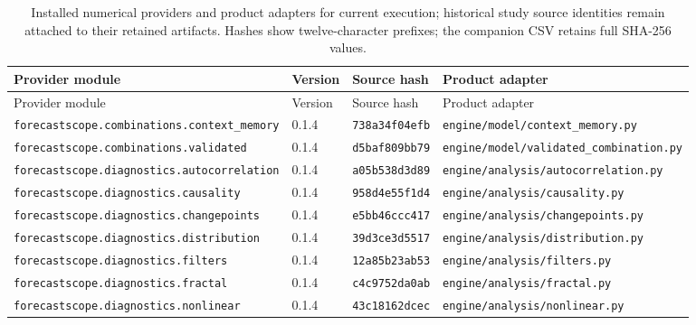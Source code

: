 \begin{longtable}{p{}p{}p{}p{}}
\caption{Installed numerical providers and product adapters for current execution; historical study source identities remain attached to their retained artifacts. Hashes show twelve-character prefixes; the companion CSV retains full SHA-256 values.}\label{tab:numerical-providers}\\
\toprule Provider module & Version & Source hash & Product adapter\\\midrule\endfirsthead
\toprule Provider module & Version & Source hash & Product adapter\\\midrule\endhead
\texttt{forecastscope.\allowbreak{}combinations.\allowbreak{}context\_memory} & 0.1.4 & \texttt{738a34f04efb} & \texttt{engine/\allowbreak{}model/\allowbreak{}context\_memory.\allowbreak{}py}\\
\texttt{forecastscope.\allowbreak{}combinations.\allowbreak{}validated} & 0.1.4 & \texttt{d5baf809bb79} & \texttt{engine/\allowbreak{}model/\allowbreak{}validated\_combination.\allowbreak{}py}\\
\texttt{forecastscope.\allowbreak{}diagnostics.\allowbreak{}autocorrelation} & 0.1.4 & \texttt{a05b538d3d89} & \texttt{engine/\allowbreak{}analysis/\allowbreak{}autocorrelation.\allowbreak{}py}\\
\texttt{forecastscope.\allowbreak{}diagnostics.\allowbreak{}causality} & 0.1.4 & \texttt{958d4e55f1d4} & \texttt{engine/\allowbreak{}analysis/\allowbreak{}causality.\allowbreak{}py}\\
\texttt{forecastscope.\allowbreak{}diagnostics.\allowbreak{}changepoints} & 0.1.4 & \texttt{e5bb46ccc417} & \texttt{engine/\allowbreak{}analysis/\allowbreak{}changepoints.\allowbreak{}py}\\
\texttt{forecastscope.\allowbreak{}diagnostics.\allowbreak{}distribution} & 0.1.4 & \texttt{39d3ce3d5517} & \texttt{engine/\allowbreak{}analysis/\allowbreak{}distribution.\allowbreak{}py}\\
\texttt{forecastscope.\allowbreak{}diagnostics.\allowbreak{}filters} & 0.1.4 & \texttt{12a85b23ab53} & \texttt{engine/\allowbreak{}analysis/\allowbreak{}filters.\allowbreak{}py}\\
\texttt{forecastscope.\allowbreak{}diagnostics.\allowbreak{}fractal} & 0.1.4 & \texttt{c4c9752da0ab} & \texttt{engine/\allowbreak{}analysis/\allowbreak{}fractal.\allowbreak{}py}\\
\texttt{forecastscope.\allowbreak{}diagnostics.\allowbreak{}nonlinear} & 0.1.4 & \texttt{43c18162dcec} & \texttt{engine/\allowbreak{}analysis/\allowbreak{}nonlinear.\allowbreak{}py}\\

\end{longtable}
